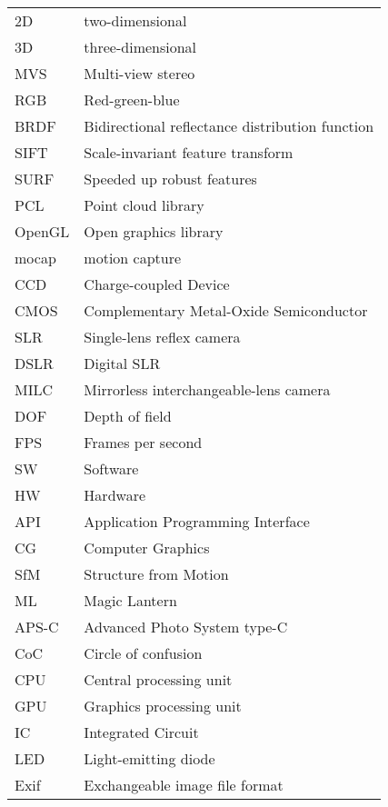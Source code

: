 \begin{tabular}{ll}
	2D & two-dimensional\\
	3D & three-dimensional\\
	MVS & Multi-view stereo\\
	RGB & Red-green-blue\\
	BRDF & Bidirectional reflectance distribution function\\
	SIFT & Scale-invariant feature transform\\
	SURF & Speeded up robust features \\
	PCL & Point cloud library\\
	OpenGL & Open graphics library\\
	mocap & motion capture\\
	CCD & Charge-coupled Device\\
	CMOS & Complementary Metal-Oxide Semiconductor\\
	SLR & Single-lens reflex camera\\
	DSLR & Digital SLR\\
	MILC & Mirrorless interchangeable-lens camera\\
	DOF & Depth of field\\
	FPS & Frames per second\\
	SW & Software\\
	HW & Hardware\\
	API & Application Programming Interface\\
	CG & Computer Graphics\\
	SfM & Structure from Motion\\
	ML & Magic Lantern\\
	APS-C & Advanced Photo System type-C\\
	CoC & Circle of confusion\\
	CPU & Central processing unit\\
	GPU & Graphics processing unit\\
	IC & Integrated Circuit\\
	LED & Light-emitting diode\\
	Exif & Exchangeable image file format\\
\end{tabular}

